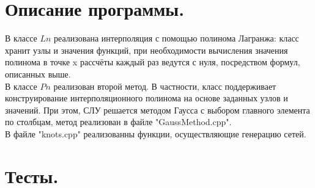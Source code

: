 \documentclass[14pt,a4paper]{extarticle}
\newcommand{\1}{\mathbbm{1}}
\begin{document}
\section{Описание программы.}

В классе $Ln$ реализована интерполяция с помощью полинома Лагранжа: класс хранит 
узлы и значения функций, при необходимости вычисления значения полинома в точке
x рассчёты каждый раз ведутся с нуля, посредством формул, описанных выше. \\
В классе $Pn$ реализован второй метод. В частности, класс поддерживает 
конструирование интерполяционного полинома на основе заданных узлов
и значений. При этом, СЛУ решается методом Гаусса с выбором главного
элемента по столбцам, метод реализован в файле "GaussMethod.cpp". \\
В файле "knots.cpp" реализованны функции, осуществляющие генерацию сетей.

\section{Тесты.}
\end{document}
